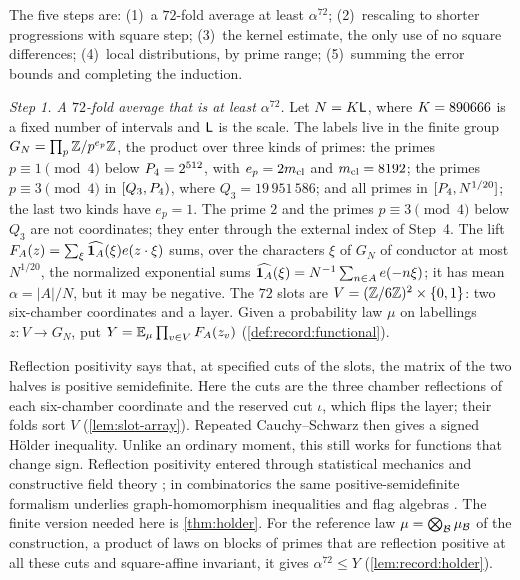 The five steps are: (1)~a $72$-fold average at least $\alpha^{72}$;
(2)~rescaling to shorter progressions with square step;
(3)~the kernel estimate, the only use of no square differences;
(4)~local distributions, by prime range; (5)~summing the error
bounds and completing the induction.

\emph{Step 1. A $72$-fold average that is at least $\alpha^{72}$.}
Let $N=K\mathsf L$, where $K=890666$ is a fixed number of intervals
and $\mathsf L$ is the scale. The labels live in the finite group
$G_N=\prod_p\mathbb Z/p^{e_p}\mathbb Z$, the product over three kinds of primes: the
primes $p\equiv1\pmod4$ below $P_4=2^{512}$, with $e_p=2m_{\mathrm{cl}}$ and
$m_{\mathrm{cl}}=8192$; the primes $p\equiv3\pmod4$ in $[Q_3,P_4)$, where
$Q_3=19\,951\,586$; and all primes in $[P_4,N^{1/20}]$; the last two
kinds have $e_p=1$. The prime $2$ and the primes $p\equiv3\pmod4$ below
$Q_3$ are not coordinates; they enter through the external index of
Step~4. The lift $F_A(z)=\sum_\xi\widehat{\mathbf 1_A}(\xi)e(z\cdot\xi)$ sums,
over the characters $\xi$ of $G_N$ of conductor at most $N^{1/20}$, the
normalized exponential sums $\widehat{\mathbf 1_A}(\xi)=N^{-1}\sum_{n\in
A}e(-n\xi)$; it has mean $\alpha=|A|/N$, but it may be negative. The $72$
slots are $V=(\mathbb Z/6\mathbb Z)^2\times\{0,1\}$: two six-chamber coordinates and a
layer. Given a probability law $\mu$ on labellings $z\colon V\to G_N$, put
$Y=\mathbb E_\mu\prod_{v\in V}F_A(z_v)$ (\cref{def:record:functional}).

Reflection positivity says that, at specified cuts of the slots, the
matrix of the two halves is positive semidefinite. Here the cuts are the
three chamber reflections of each six-chamber coordinate and the reserved
cut $\iota$, which flips the layer; their folds sort $V$
(\cref{lem:slot-array}). Repeated Cauchy--Schwarz then gives a signed
H\"older inequality. Unlike an ordinary moment, this still works for
functions that change sign. Reflection
positivity entered through statistical mechanics and constructive field
theory \cite{FrohlichSimonSpencer76,DysonLiebSimon78,FrohlichLieb,FILS,
GlimmJaffe87}; in combinatorics the same positive-semidefinite formalism
underlies graph-homomorphism inequalities and flag algebras
\cite{ConlonLee,HatamiNorine11,Razborov07,LovaszGraphLimits12,
BorgsChayesLovaszSosVesztergombi08}. The finite version needed here is
\cref{thm:holder}. For the reference law
$\mu=\bigotimes_{\mathcal B}\mu_{\mathcal B}$ of the construction, a product of laws
on blocks of primes that are reflection positive at all these cuts and
square-affine invariant, it gives $\alpha^{72}\le Y$
(\cref{lem:record:holder}).

